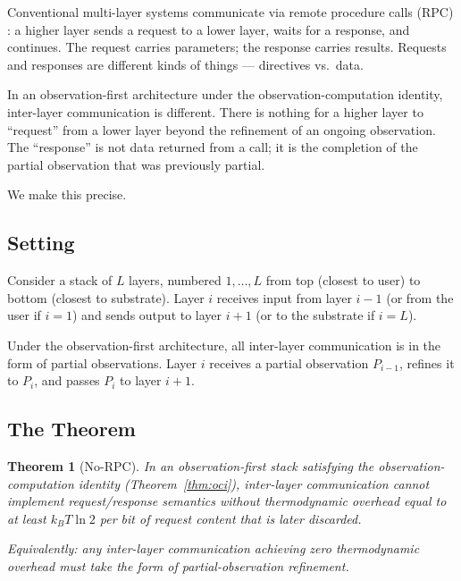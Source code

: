 \documentclass[11pt,a4paper]{article}
\newtheorem{theorem}{Theorem}[section]
\theoremstyle{definition}
\theoremstyle{remark}
\begin{document}
Conventional multi-layer systems communicate via remote procedure calls (RPC) \citep{birrell1984implementing}: a higher layer sends a request to a lower layer, waits for a response, and continues. The request carries parameters; the response carries results. Requests and responses are different kinds of things --- directives vs.\ data.

In an observation-first architecture under the observation-computation identity, inter-layer communication is different. There is nothing for a higher layer to ``request'' from a lower layer beyond the refinement of an ongoing observation. The ``response'' is not data returned from a call; it is the completion of the partial observation that was previously partial.

We make this precise.

\subsection{Setting}

Consider a stack of $L$ layers, numbered $1, \ldots, L$ from top (closest to user) to bottom (closest to substrate). Layer $i$ receives input from layer $i-1$ (or from the user if $i = 1$) and sends output to layer $i+1$ (or to the substrate if $i = L$).

Under the observation-first architecture, all inter-layer communication is in the form of partial observations. Layer $i$ receives a partial observation $P_{i-1}$, refines it to $P_i$, and passes $P_i$ to layer $i+1$.

\subsection{The Theorem}

\begin{theorem}[No-RPC]
\label{thm:norpc}
In an observation-first stack satisfying the observation-computation identity (Theorem~\ref{thm:oci}), inter-layer communication cannot implement request/response semantics without thermodynamic overhead equal to at least $k_B T \ln 2$ per bit of request content that is later discarded.

Equivalently: any inter-layer communication achieving zero thermodynamic overhead must take the form of partial-observation refinement.
\end{theorem}
\end{document}
